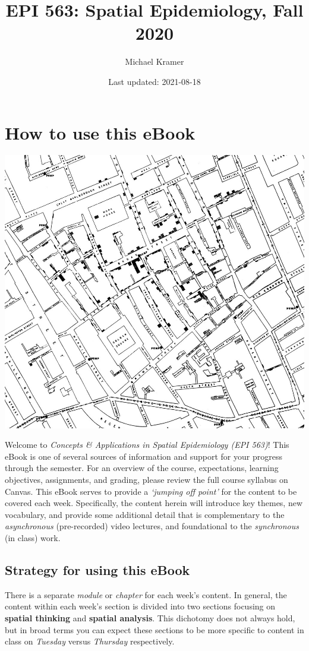 \documentclass[
]{book}
\title{EPI 563: Spatial Epidemiology, Fall 2020}
\author{Michael Kramer}
\date{Last updated: 2021-08-18}
\begin{document}
\maketitle

{
\setcounter{tocdepth}{1}
\tableofcontents
}
\hypertarget{how-to-use-this-ebook}{%
\chapter*{How to use this eBook}\label{how-to-use-this-ebook}}

\begin{center}\includegraphics[width=0.5\linewidth]{images/John-Snows-cholera-map-of-009} \end{center}

Welcome to \emph{Concepts \& Applications in Spatial Epidemiology (EPI 563)}! This eBook is one of several sources of information and support for your progress through the semester. For an overview of the course, expectations, learning objectives, assignments, and grading, please review the full course syllabus on Canvas. This eBook serves to provide a \emph{`jumping off point'} for the content to be covered each week. Specifically, the content herein will introduce key themes, new vocabulary, and provide some additional detail that is complementary to the \emph{asynchronous} (pre-recorded) video lectures, and foundational to the \emph{synchronous} (in class) work.

\hypertarget{strategy-for-using-this-ebook}{%
\section*{Strategy for using this eBook}\label{strategy-for-using-this-ebook}}

There is a separate \emph{module} or \emph{chapter} for each week's content. In general, the content within each week's section is divided into two sections focusing on \textbf{spatial thinking} and \textbf{spatial analysis}. This dichotomy does not always hold, but in broad terms you can expect these sections to be more specific to content in class on \emph{Tuesday} versus \emph{Thursday} respectively.
\end{document}
